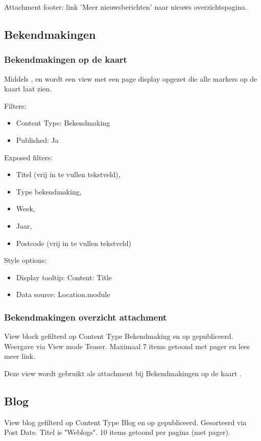 Attachment footer: link 'Meer nieuwsberichten' naar nieuws overzichtspagina.

\subsection{Bekendmakingen}
\subsubsection{Bekendmakingen op de kaart}\label{bekendmakingen-markers}

Middels ,  en  wordt een view met een page display opgezet die alle markers op de kaart laat zien.

Filters:
\begin{itemize}
\item Content Type: Bekendmaking
\item Published: Ja
\end{itemize}

Exposed filters:
\begin{itemize}
\item Titel (vrij in te vullen tekstveld),
\item Type bekendmaking,
\item Week,
\item Jaar,
\item Postcode (vrij in te vullen tekstveld)
\end{itemize}

Style options:
\begin{itemize}
\item Display tooltip: Content: Title
\item Data source: Location.module
\end{itemize}

\subsubsection{Bekendmakingen overzicht attachment}\label{bekendmakingen-overzicht}

View block gefilterd op Content Type Bekendmaking en op gepubliceerd. Weergave via View mode Teaser. Maximaal 7 items getoond met pager en lees meer link.

Deze view wordt gebruikt als attachment bij Bekendmakingen op de kaart .

\subsection{Blog}
View blog gefilterd op Content Type Blog en op gepubliceerd. Gesorteerd via Post Date. Titel is "Weblogs". 10 items getoond per pagina (met pager).

